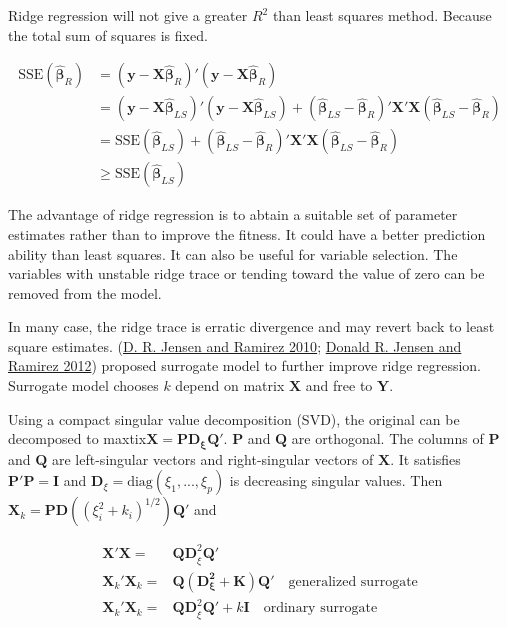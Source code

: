 \documentclass[
  11pt,
  openany]{memoir}
\begin{document}
Ridge regression will not give a greater \(R^2\) than least squares method. Because the total sum of squares is fixed.

\begin{equation}
\begin{split}
\mathrm{SSE}(\boldsymbol{\hat\beta}_{R})&=(\mathbf{y-X}\boldsymbol{\hat\beta}_{R})'(\mathbf{y-X}\boldsymbol{\hat\beta}_{R})\\
&=(\mathbf{y-X}\boldsymbol{\hat\beta}_{LS})'(\mathbf{y-X}\boldsymbol{\hat\beta}_{LS})+(\boldsymbol{\hat\beta}_{LS}-\boldsymbol{\hat\beta}_{R})'\mathbf{X'X}(\boldsymbol{\hat\beta}_{LS}-\boldsymbol{\hat\beta}_{R})\\
&=\mathrm{SSE}(\boldsymbol{\hat\beta}_{LS})+(\boldsymbol{\hat\beta}_{LS}-\boldsymbol{\hat\beta}_{R})'\mathbf{X'X}(\boldsymbol{\hat\beta}_{LS}-\boldsymbol{\hat\beta}_{R})\\
&\ge \mathrm{SSE}(\boldsymbol{\hat\beta}_{LS})
\end{split}
\end{equation}

The advantage of ridge regression is to abtain a suitable set of parameter estimates rather than to improve the fitness. It could have a better prediction ability than least squares.
It can also be useful for variable selection. The variables with unstable ridge trace or tending toward the value of zero can be removed from the model.

In many case, the ridge trace is erratic divergence and may revert back to least square estimates.
(\protect\hyperlink{ref-jensenSurrogateModelsIllconditioned2010a}{D. R. Jensen and Ramirez 2010}; \protect\hyperlink{ref-jensenVariationsRidgeTraces2012}{Donald R. Jensen and Ramirez 2012}) proposed surrogate model to further improve ridge regression. Surrogate model chooses \(k\) depend on matrix \(\mathbf{X}\) and free to \(\mathbf{Y}\).

Using a compact singular value decomposition (SVD), the original can be decomposed to maxtix\(\mathbf{X}=\mathbf{PD_{\xi}Q}'\). \(\mathbf{P}\) and \(\mathbf{Q}\) are orthogonal. The columns of \(\mathbf{P}\) and \(\mathbf{Q}\) are left-singular vectors and right-singular vectors of \(\mathbf{X}\).
It satisfies \(\mathbf{P'P}=\mathbf{I}\) and \(\mathbf{D}_{\xi}=\text{diag}(\xi_1,...,\xi_p)\) is decreasing singular values. Then \(\mathbf{X}_k=\mathbf{PD}((\xi_i^2+k_i)^{1/2})\mathbf{Q}'\) and

\begin{equation}
\begin{split}
\mathbf{X'X}=&\mathbf{QD}_\xi^2\mathbf{Q}'\\
\mathbf{X}_k'\mathbf{X}_k=&\mathbf{Q(D_\xi^2+K)}\mathbf{Q}'\quad\text{generalized surrogate}\\
\mathbf{X}_k'\mathbf{X}_k=&\mathbf{QD}_\xi^2\mathbf{Q}'+k\mathbf{I}\quad\text{ordinary surrogate}
\end{split}
\end{equation}
\end{document}
